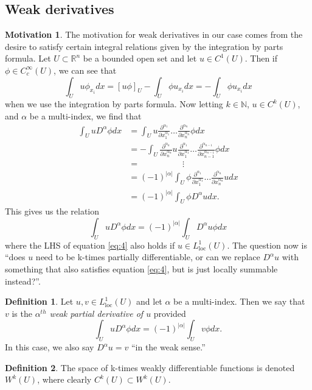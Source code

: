 \documentclass[11pt]{article}
\theoremstyle{definition}
\newtheorem*{definition}{Definition}
\newtheorem*{motivation}{Motivation}
\begin{document}
\subsection{Weak derivatives}
\begin{motivation}
	The motivation for weak derivatives in our case comes from the desire to satisfy certain integral relations given by the integration by parts formula.
	Let $U \subset \mathbb{R}^n$ be a bounded open set and let $u\in C^1(U)$. Then if $\phi \in C_{c}^{\infty}(U)$, we can see that
	\begin{equation*}
		\int_U u\phi_{x_i}dx = [u\phi]_U - \int_U \phi u_{x_i}dx = - \int_U \phi u_{x_i}dx
	\end{equation*}
	when we use the integration by parts formula. Now letting $k\in \mathbb{N}$, $u \in C^k(U)$, and $\alpha$ be a multi-index, we find that
	\begin{equation*}
		\begin{aligned}
			\int_U u D^{\alpha}\phi dx &= \int_U u \frac{\partial^{\alpha_1}}{\partial x_1^{\alpha_1}}\dots\frac{\partial^{\alpha_n}}{\partial x_n^{\alpha_n}}\phi dx \\
						   &= - \int_U \frac{\partial^{\alpha_n}}{\partial x_n^{\alpha_n}}u \frac{\partial^{\alpha_1}}{\partial x_1^{\alpha_1}}\dots\frac{\partial^{\alpha_{n-1}}}{\partial x_{n-1}^{\alpha_{n-1}}}\phi dx \\
						   &= \quad\qquad\qquad\vdots \\ 
						   &= (-1)^{|\alpha|}\int_U \phi\frac{\partial^{\alpha_1}}{\partial x_1^{\alpha_1}}\dots\frac{\partial^{\alpha_n}}{\partial x_n^{\alpha_n}}u dx \\
						   &= (-1)^{|\alpha|}\int_U \phi D^{\alpha}u dx.
		\end{aligned}
	\end{equation*}
	This gives us the relation
	\begin{equation}
		\label{eq:4}
		\int_U u D^{\alpha}\phi dx = (-1)^{|\alpha|}\int_U D^{\alpha}u\phi  dx
	\end{equation}
	where the LHS of equation \ref{eq:4} also holds if $u\in L_{\text{loc}}^1(U)$.
	The question now is ``does $u$ need to be k-times partially differentiable, or can we replace $D^{\alpha}u$ with something that also satisfies
	equation \ref{eq:4}, but is just locally summable instead?''.
\end{motivation}
\begin{definition}
	Let $u,v \in L_{\text{loc}}^1(U)$ and let $\alpha$ be a multi-index. Then we say that $v$ is the 
	\textit{$\alpha^{th}$ weak partial derivative of $u$} provided
	\begin{equation*}
		\int_U u D^{\alpha}\phi dx = (-1)^{|\alpha|}\int_U v \phi dx.
	\end{equation*}
	In this case, we also say $D^{\alpha}u = v$ ``in the weak sense.''
\end{definition}
\begin{definition}
	The space of k-times weakly differentiable functions is denoted $W^k(U)$, where clearly $C^k(U) \subset W^k(U)$.
\end{definition}
\end{document}
